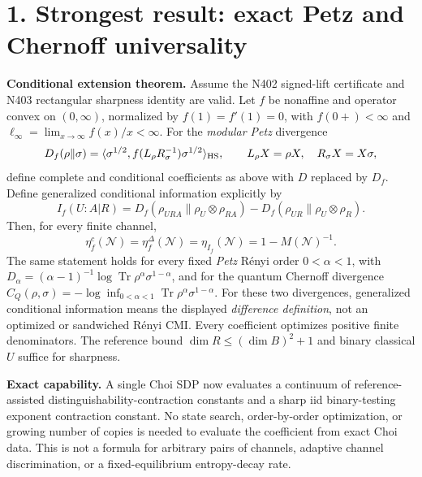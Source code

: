 \documentclass[10pt,a4paper]{article}
\newcommand{\Tr}{\operatorname{Tr}}
\newcommand{\N}{\mathcal N}
\begin{document}
\section*{1. Strongest result: exact Petz and Chernoff universality}

\textbf{Conditional extension theorem.} Assume the N402 signed-lift certificate and N403 rectangular sharpness identity are valid. Let $f$ be nonaffine and operator convex on $(0,\infty)$, normalized by $f(1)=f'(1)=0$, with $f(0+)<\infty$ and $\ell_\infty=\lim_{x\to\infty}f(x)/x<\infty$. For the \emph{modular Petz} divergence
\[
 D_f(\rho\|\sigma)=\langle\sigma^{1/2},f(L_\rho R_\sigma^{-1})\sigma^{1/2}\rangle_{\rm HS},
 \qquad L_\rho X=\rho X,\quad R_\sigma X=X\sigma,
\]
define complete and conditional coefficients as above with $D$ replaced by $D_f$. Define generalized conditional information explicitly by
\[
 I_f(U:A|R)=D_f(\rho_{URA}\|\rho_U\otimes\rho_{RA})
             -D_f(\rho_{UR}\|\rho_U\otimes\rho_R).
\]
Then, for every finite channel,
\[
 \boxed{\quad \eta_f^c(\N)=\eta_f^\Delta(\N)=\eta_{I_f}(\N)=1-M(\N)^{-1}.\quad} \tag{P1}
\]
The same statement holds for every fixed \emph{Petz} R\'enyi order $0<\alpha<1$, with $D_\alpha=(\alpha-1)^{-1}\log\Tr\rho^\alpha\sigma^{1-\alpha}$, and for the quantum Chernoff divergence
$C_Q(\rho,\sigma)=-\log\inf_{0<\alpha<1}\Tr\rho^\alpha\sigma^{1-\alpha}$.
For these two divergences, generalized conditional information means the displayed \emph{difference definition}, not an optimized or sandwiched R\'enyi CMI. Every coefficient optimizes positive finite denominators. The reference bound $\dim R\le(\dim B)^2+1$ and binary classical $U$ suffice for sharpness.

\textbf{Exact capability.} A single Choi SDP now evaluates a continuum of reference-assisted distinguishability-contraction constants and a sharp iid binary-testing exponent contraction constant. No state search, order-by-order optimization, or growing number of copies is needed to evaluate the coefficient from exact Choi data. This is not a formula for arbitrary pairs of channels, adaptive channel discrimination, or a fixed-equilibrium entropy-decay rate.
\end{document}
